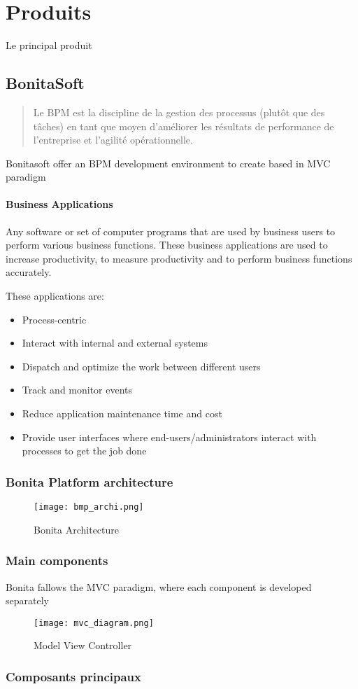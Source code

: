 \section{Produits}
Le principal produit
\subsection{BonitaSoft}
\begin{quotation}
Le BPM est la discipline de la gestion des processus (plutôt que des tâches) en tant que moyen d'améliorer les résultats de performance de l'entreprise et l'agilité opérationnelle. \cite{gartnerdic}
\end{quotation}

Bonitasoft offer an BPM development environment to create  based in MVC paradigm

\paragraph{Business Applications} \label{businessApp}
Any software or set of computer programs that are used by business users to perform various business functions. These business applications are used to increase productivity, to measure productivity and to perform business functions accurately.\cite{BusinessSoftware}

These applications are:
\begin{itemize}
\item Process-centric
\item Interact with internal and external systems
\item Dispatch and optimize the work between different users
\item Track and monitor events
\item Reduce application maintenance time and cost
\item Provide user interfaces where end-users/administrators interact with processes to get the job done
\end{itemize}

\subsubsection{Bonita Platform architecture}
\begin{figure}[!ht]
\texttt{[image: bmp\_archi.png]}
\caption{Bonita Architecture}
\end{figure}

\subsubsection{Main components}
Bonita fallows the MVC paradigm, where each component is developed separately

\begin{figure}[!ht]
\texttt{[image: mvc\_diagram.png]}
\caption{Model View Controller}
\end{figure}


\subsubsection{Composants principaux}






